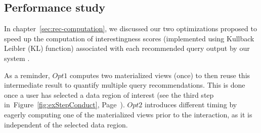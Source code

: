 \subsection{Performance study} 
\begin{table}[b]
\centering
{}
 \caption{Set of exploration queries used in the evaluation}
 \label{tab:queries2}
\end{table}
In chapter~\ref{sec:rec-computation}, we discussed our two optimizations proposed to speed up the computation of interestingness scores (implemented using Kullback Leibler (KL) function) associated with each recommended query output by our system \prototype{}. 


As a reminder, $Opt1$ computes two materialized views (once) to then reuse this intermediate result to quantify multiple query recommendations. This is done once a user has selected a data region of interest (see the third step in~Figure~\ref{fig:exStepConduct}, Page~\pageref{fig:exStepConduct}). $Opt2$ introduces different timing by eagerly computing one of the materialized views prior to the interaction, as it is independent of the selected data region. 



